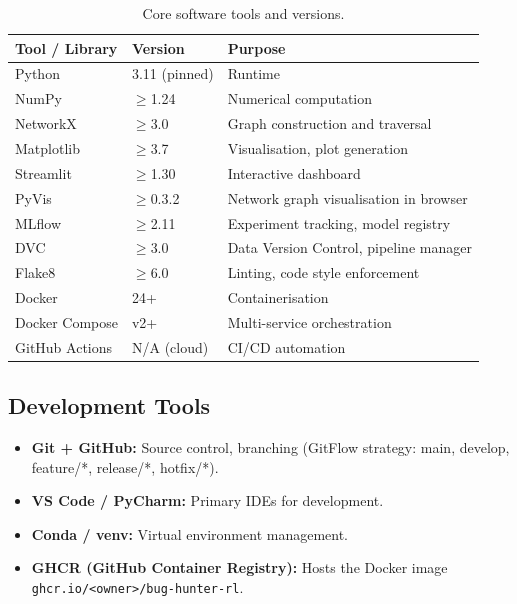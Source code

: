 \documentclass[12pt,a4paper]{report}
\begin{document}
\begin{table}[H]
  \centering
  \caption{Core software tools and versions.}
  \label{tab:software}
  \begin{tabular}{lll}
    \toprule
    \textbf{Tool / Library} & \textbf{Version} & \textbf{Purpose} \\
    \midrule
    Python         & 3.11 (pinned)      & Runtime \\
    NumPy          & $\geq$1.24         & Numerical computation \\
    NetworkX       & $\geq$3.0          & Graph construction and traversal \\
    Matplotlib     & $\geq$3.7          & Visualisation, plot generation \\
    Streamlit      & $\geq$1.30         & Interactive dashboard \\
    PyVis          & $\geq$0.3.2        & Network graph visualisation in browser \\
    MLflow         & $\geq$2.11         & Experiment tracking, model registry \\
    DVC            & $\geq$3.0          & Data Version Control, pipeline manager \\
    Flake8         & $\geq$6.0          & Linting, code style enforcement \\
    Docker         & 24+                & Containerisation \\
    Docker Compose & v2+                & Multi-service orchestration \\
    GitHub Actions & N/A (cloud)        & CI/CD automation \\
    \bottomrule
  \end{tabular}
\end{table}

\subsection{Development Tools}

\begin{itemize}[leftmargin=1.5em]
  \item \textbf{Git + GitHub:} Source control, branching (GitFlow
        strategy: main, develop, feature/*, release/*, hotfix/*).
  \item \textbf{VS Code / PyCharm:} Primary IDEs for development.
  \item \textbf{Conda / venv:} Virtual environment management.
  \item \textbf{GHCR (GitHub Container Registry):}
        Hosts the Docker image \texttt{ghcr.io/<owner>/bug-hunter-rl}.
\end{itemize}
\end{document}
